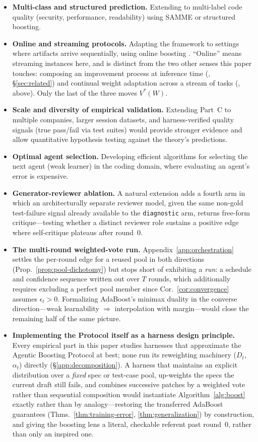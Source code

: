 \begin{itemize}[leftmargin=*,itemsep=2pt]
    \item \textbf{Multi-class and structured prediction.} Extending to multi-label code quality (security, performance, readability) using SAMME \citep{zhu2009multi} or structured boosting.
    \item \textbf{Online and streaming protocols.} Adapting the framework to settings where artifacts arrive sequentially, using online boosting \citep{beygelzimer2015optimal}. ``Online'' means streaming instances here, and is distinct from the two other senses this paper touches: composing an improvement process at inference time (\citealp{xue2026rethinking}, \S\ref{sec:related}) and continual weight adaptation across a stream of tasks (\citealp{zweiger2025seal}, above). Only the last of the three moves $V^*(W)$.
    \item \textbf{Scale and diversity of empirical validation.} Extending Part~C to multiple companies, larger session datasets, and harness-verified quality signals (true pass/fail via test suites) would provide stronger evidence and allow quantitative hypothesis testing against the theory's predictions.
    \item \textbf{Optimal agent selection.} Developing efficient algorithms for selecting the next agent (weak learner) in the coding domain, where evaluating an agent's error is expensive.
    \item \textbf{Generator-reviewer ablation.} A natural extension adds a fourth arm in which an architecturally separate reviewer model, given the same non-gold test-failure signal already available to the \texttt{diagnostic} arm, returns free-form critique---testing whether a distinct reviewer role sustains a positive edge where self-critique plateaus after round~0.
    \item \textbf{The multi-round weighted-vote run.} Appendix~\ref{app:orchestration} settles the per-round edge for a reused pool in both directions (Prop.~\ref{prop:pool-dichotomy}) but stops short of exhibiting a \emph{run}: a schedule and confidence sequence written out over $T$ rounds, which additionally requires excluding a perfect pool member since Cor.~\ref{cor:convergence} assumes $\epsilon_t>0$. Formalizing AdaBoost's minimax duality in the converse direction---weak learnability $\Rightarrow$ interpolation with margin---would close the remaining half of the same picture.
    \item \textbf{Implementing the Protocol itself as a harness design principle.} Every empirical part in this paper studies harnesses that approximate the Agentic Boosting Protocol at best; none run its reweighting machinery ($D_t$, $\alpha_t$) directly (\S\ref{app:decomposition}). A harness that maintains an explicit distribution over a \emph{fixed} spec or test-case pool, up-weights the specs the current draft still fails, and combines successive patches by a weighted vote rather than sequential composition would instantiate Algorithm~\ref{alg:boost} exactly rather than by analogy---restoring the transferred AdaBoost guarantees (Thms.~\ref{thm:training-error}, \ref{thm:generalization}) by construction, and giving the boosting lens a literal, checkable referent past round~0, rather than only an inspired one.

\end{itemize}
